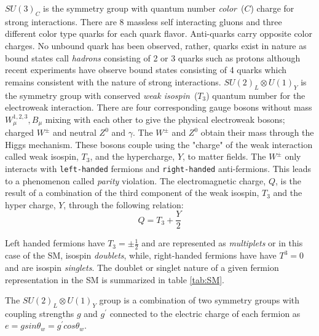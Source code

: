 $SU(3)_{C}$ is the symmetry group with quantum number \textit{color}~($C$) charge for strong interactions. There are 8 massless self interacting gluons and three different color type quarks for each quark flavor.  Anti-quarks carry opposite color charges. No unbound quark has been observed, rather, quarks exist in nature as bound states call \textit{hadrons} consisting of 2 or 3 quarks such as protons although recent experiments have observe bound states consisting of 4 quarks which remains consistent with the nature of strong interactions.
\newline
 $SU(2)_{L} \otimes U(1)_{Y}$ is the symmetry group with conserved \textit{weak isospin}~($T_{3}$)  quantum number for the electroweak interaction. There are four corresponding gauge bosons without mass $W^{1,2,3}_{\mu}, B_{\mu} $  mixing with each other to give the physical electroweak bosons; charged $W^{\pm}$ and neutral $Z^{0}$ and $\gamma$. The $W^{\pm}$ and $Z^{0}$ obtain their mass through the Higgs mechanism. These bosons couple using the "charge" of the weak interaction called weak isospin, $T_{3}$, and the hypercharge, $Y$, to matter fields. The $W^{\pm}$ only interacts with \texttt{left-handed} fermions and \texttt{right-handed} anti-fermions. This leads to a phenomenon called \textit{parity} violation. The electromagnetic charge, $Q$, is the result of a combination of the third component of the weak isospin, $T_{3}$ and the hyper charge, $Y$, through the following relation:
\begin{equation}
Q = T_{3} + \frac{Y}{2}
\end{equation}

Left handed fermions have $T_{3} = \pm \frac{1}{2}$ and are represented as \textit{multiplets } or in this case of the SM, isospin \textit{doublets},  while, right-handed fermions have have $T^{3} = 0$ and are isospin \textit{singlets}. The doublet or singlet nature of a given fermion representation in the SM is summarized in table \ref{tab:SM}.


The $SU(2)_{L} \otimes U(1)_{Y}$ group is a combination of two symmetry groups with coupling strengths $g$ and $g^{\prime}$ connected to the electric charge of each fermion as $e = g sin \theta_{w} = g^{\prime} cos \theta_{w}$.


